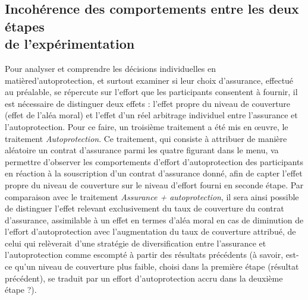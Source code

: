 \begin{Article}
\begin{refsection}[Mouminoux]
\subsection{Incohérence des comportements entre les deux étapes\\ de l'expérimentation}
\label{section:H2selfpro}

Pour analyser et comprendre les décisions individuelles en matière\linebreak d'autoprotection, et surtout examiner si leur choix d'assurance, effectué au préalable, se répercute sur l'effort que les participants consentent à fournir, il est nécessaire de distinguer deux effets : l'effet propre du niveau de couverture (effet de l'aléa moral) et l'effet d'un réel arbitrage individuel entre l'assurance et l'autoprotection. Pour ce faire, un troisième traitement a été mis en \oe uvre, le traitement\textit{ Autoprotection}. Ce traitement, qui consiste à attribuer de manière aléatoire un contrat d'assurance parmi les quatre figurant dans le menu, va permettre d'observer les comportements d'effort d'autoprotection des participants en réaction à la souscription d'un contrat d'assurance donné, afin de capter l'effet propre du niveau de couverture sur le niveau d'effort fourni en seconde étape. Par comparaison avec le traitement \textit{Assurance + autoprotection}, il sera ainsi possible de distinguer l'effet relevant exclusivement du taux de couverture du contrat d'assurance, assimilable à un effet en termes d'aléa moral en cas de diminution de l'effort d'autoprotection avec l'augmentation du taux de couverture attribué, de celui qui relèverait d'une stratégie de diversification entre l'assurance et l'autoprotection comme escompté à partir des résultats précédents (à savoir, est-ce qu'un niveau de couverture plus faible, choisi dans la première étape (résultat précédent), se traduit par un effort d'autoprotection accru dans la deuxième étape ?).


\end{refsection}
\end{Article}
